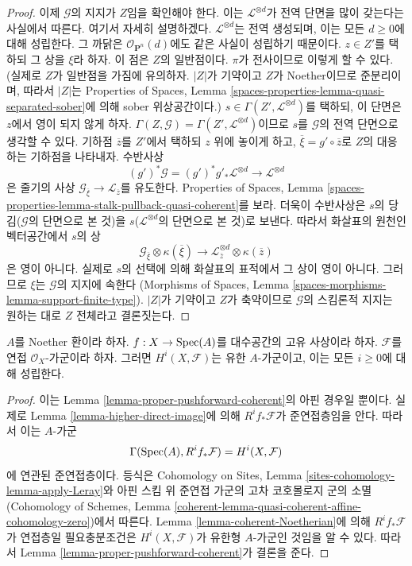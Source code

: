 \begin{proof}
\medskip\noindent
이제 $\mathcal{G}$의 지지가 $Z$임을 확인해야 한다. 이는
$\mathcal{L}^{\otimes d}$가 전역 단면을 많이 갖는다는 사실에서
따른다. 여기서 자세히 설명하겠다. $\mathcal{L}^{\otimes d}$는 전역
생성되며, 이는 모든 $d \geq 0$에 대해 성립한다. 그 까닭은
$\mathcal{O}_{\mathbf{P}^n}(d)$에도 같은 사실이 성립하기 때문이다.
$z \in Z'$를 택하되 그 상을 $\xi$라 하자. 이 점은 $Z$의 일반점이다.
$\pi$가 전사이므로 이렇게 할 수 있다. (실제로 $Z$가 일반점을 가짐에
유의하자. $|Z|$가 기약이고 $Z$가 Noether이므로 준분리이며, 따라서
$|Z|$는 Properties of Spaces, Lemma
\ref{spaces-properties-lemma-quasi-separated-sober}에 의해 sober
위상공간이다.) $s \in \Gamma(Z', \mathcal{L}^{\otimes d})$를 택하되,
이 단면은 $z$에서 영이 되지 않게 하자.
$\Gamma(Z, \mathcal{G}) = \Gamma(Z', \mathcal{L}^{\otimes d})$이므로
$s$를 $\mathcal{G}$의 전역 단면으로 생각할 수 있다. 기하점
$\overline{z}$를 $Z'$에서 택하되 $z$ 위에 놓이게 하고,
$\overline{\xi} = g' \circ \overline{z}$로 $Z$의 대응하는 기하점을
나타내자. 수반사상
$$
(g')^*\mathcal{G} =
(g')^*g'_*\mathcal{L}^{\otimes d} \longrightarrow \mathcal{L}^{\otimes d}
$$
은 줄기의 사상
$\mathcal{G}_{\overline{\xi}} \to \mathcal{L}_{\overline{z}}$를
유도한다. Properties of Spaces, Lemma
\ref{spaces-properties-lemma-stalk-pullback-quasi-coherent}를 보라.
더욱이 수반사상은 $s$의 당김($\mathcal{G}$의 단면으로 본 것)을
$s$($\mathcal{L}^{\otimes d}$의 단면으로 본 것)로 보낸다. 따라서
화살표의 원천인 벡터공간에서 $s$의 상
$$
\mathcal{G}_{\overline{\xi}} \otimes \kappa(\overline{\xi})
\longrightarrow
\mathcal{L}^{\otimes d}_{\overline{z}} \otimes \kappa(\overline{z})
$$
은 영이 아니다. 실제로 $s$의 선택에 의해 화살표의 표적에서 그 상이
영이 아니다. 그러므로 $\xi$는 $\mathcal{G}$의 지지에 속한다
(Morphisms of Spaces, Lemma
\ref{spaces-morphisms-lemma-support-finite-type}). $|Z|$가 기약이고
$Z$가 축약이므로 $\mathcal{G}$의 스킴론적 지지는 원하는 대로
$Z$ 전체라고 결론짓는다.
\end{proof}

\begin{lemma}
\label{lemma-proper-over-affine-cohomology-finite}
$A$를 Noether 환이라 하자. $f : X \to \mathop{\mathrm{Spec}}(A)$를 대수공간의 고유
사상이라 하자. $\mathcal{F}$를 연접 $\mathcal{O}_X$-가군이라 하자.
그러면 $H^i(X, \mathcal{F})$는 유한 $A$-가군이고, 이는 모든
$i \geq 0$에 대해 성립한다.
\end{lemma}

\begin{proof}
이는 Lemma \ref{lemma-proper-pushforward-coherent}의 아핀 경우일 뿐이다.
실제로 Lemma \ref{lemma-higher-direct-image}에 의해
$R^if_*\mathcal{F}$가 준연접층임을 안다. 따라서 이는 $A$-가군
$$
\Gamma(\mathop{\mathrm{Spec}}(A), R^if_*\mathcal{F}) = H^i(X, \mathcal{F})
$$
에 연관된 준연접층이다. 등식은 Cohomology on Sites, Lemma
\ref{sites-cohomology-lemma-apply-Leray}와 아핀 스킴 위 준연접 가군의
고차 코호몰로지 군의 소멸(Cohomology of Schemes, Lemma
\ref{coherent-lemma-quasi-coherent-affine-cohomology-zero})에서
따른다. Lemma \ref{lemma-coherent-Noetherian}에 의해
$R^if_*\mathcal{F}$가 연접층일 필요충분조건은
$H^i(X, \mathcal{F})$가 유한형 $A$-가군인 것임을 알 수 있다.
따라서 Lemma \ref{lemma-proper-pushforward-coherent}가 결론을 준다.
\end{proof}

